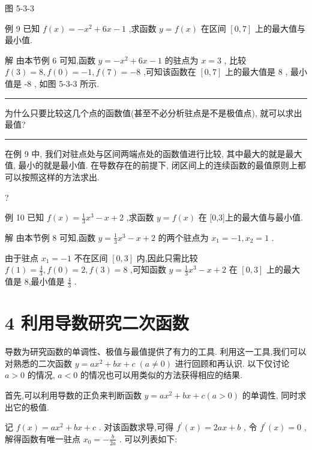 \documentclass[10pt]{article}
\newcommand{\HRule}{\begin{center}\rule{0.9\linewidth}{0.2mm}\end{center}}
\begin{document}
图 5-3-3

例 9 已知 \(f\left( x\right)  =  - {x}^{2} + {6x} - 1\) ,求函数 \(y = f\left( x\right)\) 在区间 \(\left\lbrack  {0,7}\right\rbrack\) 上的最大值与最小值.

解 由本节例 6 可知,函数 \(y =  - {x}^{2} + {6x} - 1\) 的驻点为 \(x = 3\) , 比较 \(f\left( 3\right)  = 8,f\left( 0\right)  =  - 1,f\left( 7\right)  =  - 8\) ,可知该函数在 \(\left\lbrack  {0,7}\right\rbrack\) 上的最大值是 8 , 最小值是 -8 , 如图 5-3-3 所示.

\HRule

为什么只要比较这几个点的函数值(甚至不必分析驻点是不是极值点), 就可以求出最值?

\HRule

在例 9 中, 我们对驻点处与区间两端点处的函数值进行比较, 其中最大的就是最大值, 最小的就是最小值. 在导数存在的前提下, 闭区间上的连续函数的最值原则上都可以按照这样的方法求出.

?

例 10 已知 \(f\left( x\right)  = \frac{1}{3}{x}^{3} - x + 2\) ,求函数 \(y = f\left( x\right)\) 在 [0,3]上的最大值与最小值.

解 由本节例 8 可知,函数 \(y = \frac{1}{3}{x}^{3} - x + 2\) 的两个驻点为 \({x}_{1} =  - 1,{x}_{2} = 1\) .

由于驻点 \({x}_{1} =  - 1\) 不在区间 \(\left\lbrack  {0,3}\right\rbrack\) 内,因此只需比较 \(f\left( 1\right)  = \frac{4}{3},f\left( 0\right)  = 2,f\left( 3\right)  = 8\) ,可知函数 \(y = \frac{1}{3}{x}^{3} - x + 2\) 在 \(\left\lbrack  {0,3}\right\rbrack\) 上的最大值是 8,最小值是 \(\frac{4}{3}\) .

\section*{4 利用导数研究二次函数}

导数为研究函数的单调性、极值与最值提供了有力的工具. 利用这一工具,我们可以对熟悉的二次函数 \(y = a{x}^{2} + {bx} + c \; \left( {a \neq  0}\right)\) 进行回顾和再认识. 以下仅讨论 \(a > 0\) 的情况, \(a < 0\) 的情况也可以用类似的方法获得相应的结果.

首先,可以利用导数的正负来判断函数 \(y = a{x}^{2} + {bx} + c\left( {a > 0}\right)\) 的单调性, 同时求出它的极值.

记 \(f\left( x\right)  = a{x}^{2} + {bx} + c\) . 对该函数求导,可得 \({f}^{\prime }\left( x\right)  = {2ax} + b\) , 令 \({f}^{\prime }\left( x\right)  = 0\) ,解得函数有唯一驻点 \({x}_{0} =  - \frac{b}{2a}\) . 可以列表如下:
\end{document}
